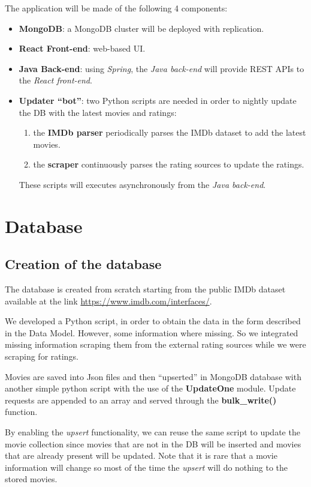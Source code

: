 \documentclass[11pt]{article}
\begin{document}
The application will be made of the following 4 components:
\begin{itemize}
	\item \textbf{MongoDB}: a MongoDB cluster will be deployed with
		replication.
	\item \textbf{React Front-end}: web-based UI.
	\item \textbf{Java Back-end}: using \emph{Spring}, the \emph{Java back-end} will provide REST APIs to the \emph{React front-end}.
	\item \textbf{Updater ``bot''}: two Python scripts are needed in order to nightly update the DB with the latest movies and ratings: 
	\begin{enumerate}
		\item the \textbf{IMDb parser} periodically parses the IMDb dataset to add the latest movies.
		\item the \textbf{scraper} continuously parses the rating sources to update the ratings.
	\end{enumerate}
	These scripts will executes asynchronously from the \emph{Java back-end}.
\end{itemize}


\section{Database}

\subsection{Creation of the database}
The database is created from scratch starting from the public IMDb dataset available at the link \href{https://www.imdb.com/interfaces/}{https://www.imdb.com/interfaces/}.

We developed a Python script, in order to obtain the data in the form described in the Data Model. However, some information where missing. So we integrated missing information scraping them from the external rating sources while we were scraping for ratings.

Movies are saved into Json files and then ``upserted'' in MongoDB database with another simple python script with the use of the \textbf{UpdateOne} module. Update requests are appended to an array and served through the \textbf{bulk\_write()} function.

By enabling the \emph{upsert} functionality, we can reuse the same script to 
update the movie collection since movies that are not in the DB will be
inserted and movies that are already present will be updated. Note that it is
rare that a movie information will change so most of the time the \emph{upsert}
will do nothing to the stored movies.
\end{document}
